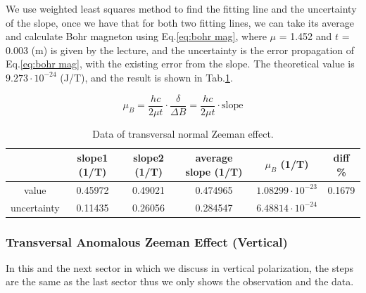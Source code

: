 \documentclass[a4paper,12pt]{article}
\begin{document}
    \par We use weighted least squares method to find the fitting line and the uncertainty of the slope, once we have that for both two fitting lines, we can take its average and calculate Bohr magneton using Eq.\ref{eq:bohr mag}, where $\mu$ = 1.452 and $t$ = 0.003 (m) is given by the lecture, and the uncertainty is the error propagation of Eq.\ref{eq:bohr mag}, with the existing error from the slope. The theoretical value is $9.273\cdot 10^{-24}$ (J/T), and the  result is shown in Tab.\ref{tab:tra_nor_final_data}. 
    
    \begin{equation}
        \mu_B = \frac{hc}{2\mu t} \cdot \frac{\delta}{\Delta B}=\frac{hc}{2\mu t} \cdot \text{slope}
        \label{eq:bohr mag}  
    \end{equation}
    
    \begin{table}[H]
        \centering
        \caption{Data of transversal normal Zeeman effect.}
        \begin{tabular}{c|c|c|c|c|c}
             &slope1 (1/T)& slope2 (1/T)& average slope (1/T)& $\mu_B$ (1/T)& diff \% \\ \hline \hline
            value&0.45972&0.49021&0.474965&$1.08299\cdot 10^{-23}$&0.1679  \\ \hline
            uncertainty&0.11435&0.26056&0.284547&$6.48814\cdot10^{-24}$& \\ \hline
            
        \end{tabular}
        \label{tab:tra_nor_final_data}
    \end{table}
    
    \subsubsection{Transversal Anomalous Zeeman Effect (Vertical)}\label{4.2.3}
    
    \par In this and the next sector in which we discuss in vertical polarization, the steps are the same as the last sector thus we only shows the observation and the data. 
    
\end{document}
